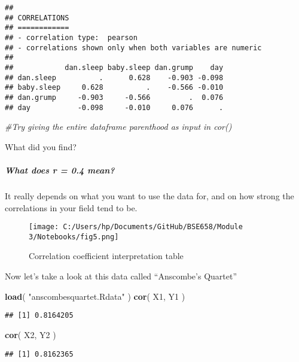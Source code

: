 \documentclass[
]{article}
\newenvironment{Shaded}{\begin{snugshade}}{\end{snugshade}}
\newcommand{\CommentTok}[1]{\textcolor[rgb]{0.56,0.35,0.01}{\textit{#1}}}
\newcommand{\FunctionTok}[1]{\textcolor[rgb]{0.13,0.29,0.53}{\textbf{#1}}}
\newcommand{\NormalTok}[1]{#1}
\newcommand{\StringTok}[1]{\textcolor[rgb]{0.31,0.60,0.02}{#1}}
\begin{document}
\begin{verbatim}
## 
## CORRELATIONS
## ============
## - correlation type:  pearson 
## - correlations shown only when both variables are numeric
## 
##            dan.sleep baby.sleep dan.grump    day
## dan.sleep          .      0.628    -0.903 -0.098
## baby.sleep     0.628          .    -0.566 -0.010
## dan.grump     -0.903     -0.566         .  0.076
## day           -0.098     -0.010     0.076      .
\end{verbatim}

\begin{Shaded}
\begin{Highlighting}[]
\CommentTok{\#Try giving the entire dataframe \textquotesingle{}parenthood\textquotesingle{} as input in cor()}
\end{Highlighting}
\end{Shaded}

What did you find?

\subparagraph{What does r = 0.4 mean?}\label{what-does-r-0.4-mean}

It really depends on what you want to use the data for, and on how
strong the correlations in your field tend to be.

\begin{figure}
\centering
\texttt{[image: C:/Users/hp/Documents/GitHub/BSE658/Module 3/Notebooks/fig5.png]}
\caption{Correlation coefficient interpretation table}
\end{figure}

Now let's take a look at this data called ``Anscombe's Quartet''

\begin{Shaded}
\begin{Highlighting}[]
\FunctionTok{load}\NormalTok{( }\StringTok{"anscombesquartet.Rdata"}\NormalTok{ )}
\FunctionTok{cor}\NormalTok{( X1, Y1 )}
\end{Highlighting}
\end{Shaded}

\begin{verbatim}
## [1] 0.8164205
\end{verbatim}

\begin{Shaded}
\begin{Highlighting}[]
\FunctionTok{cor}\NormalTok{( X2, Y2 )}
\end{Highlighting}
\end{Shaded}

\begin{verbatim}
## [1] 0.8162365
\end{verbatim}
\end{document}

